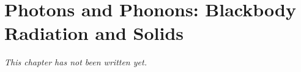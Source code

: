 \chapter{Photons and Phonons: Blackbody Radiation and Solids}\label{ch:b3:photons-phonons}


\emph{This chapter has not been written yet.}

